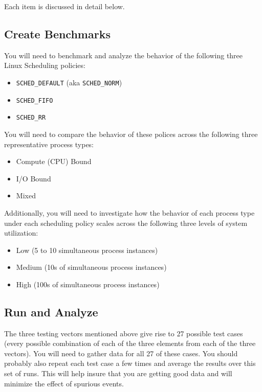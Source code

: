 \documentclass[12pt]{article}
\begin{document}
Each item is discussed in detail below.

\subsection{Create Benchmarks}

You will need to benchmark and analyze the behavior of the following
three Linux Scheduling policies:

\begin{itemize}
\item \texttt{SCHED\_DEFAULT} (aka \texttt{SCHED\_NORM})
\item \texttt{SCHED\_FIFO}
\item \texttt{SCHED\_RR}
\end{itemize}

You will need to compare the behavior of these polices across the
following three representative process types:

\begin{itemize}
\item Compute (CPU) Bound
\item I/O Bound
\item Mixed
\end{itemize}

Additionally, you will need to investigate how the behavior of each
process type under each scheduling policy scales across the following
three levels of system utilization:

\begin{itemize}
\item Low (5 to 10 simultaneous process instances)
\item Medium (10s of simultaneous process instances)
\item High (100s of simultaneous process instances)
\end{itemize}

\subsection{Run and Analyze}

The three testing vectors mentioned above give rise to 27 possible
test cases (every possible combination of each of the three elements
from each of the three vectors). You will need to gather data for all
27 of these cases. You should probably also repeat each
test case a few times and average the results over this set
of runs. This will help insure that you are getting good data and
will minimize the effect of spurious events.
\end{document}
